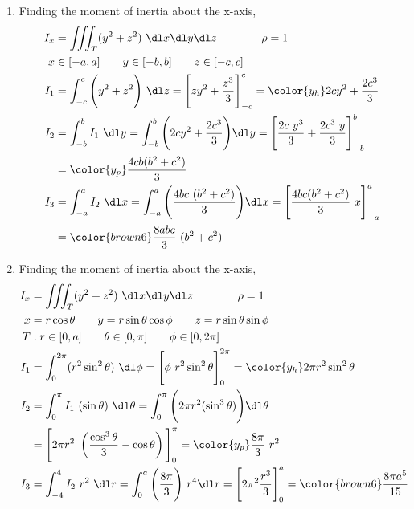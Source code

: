 \begin{enumerate}
     \item Finding the moment of inertia about the x-axis,
           \begin{align}
                I_x & = \iiint_T (y^2 + z^2)\ \dl x \dl y \dl z \qquad\qquad \rho = 1 \\
                x   & \in [-a, a] \qquad y \in [-b, b] \qquad z \in [-c, c]           \\
                I_1 & = \int_{-c}^{c} \Bigg(y^2 + z^2\Bigg)\ \dl z
                = \Bigg[ zy^2 + \frac{z^3}{3} \Bigg]_{-c}^{c}
                = {\color{y_h} 2cy^2 + \frac{2c^3}{3}}                                \\
                I_2 & = \int_{-b}^{b} I_1 \ \dl y
                = \int_{-b}^{b} \Bigg( 2cy^2 + \frac{2c^3}{3} \Bigg) \dl y
                = \Bigg[ \frac{2c\ y^3}{3} + \frac{2c^3\ y}{3} \Bigg]_{-b}^{b}        \\
                    & = {\color{y_p} \frac{4cb(b^2 + c^2)}{3} }                       \\
                I_3 & = \int_{-a}^{a} I_2\ \dl x = \int_{-a}^{a}
                \Bigg( \frac{4bc\ (b^2 + c^2)}{3} \Bigg) \dl x
                = \Bigg[ \frac{4bc (b^2 + c^2)}{3}\ x \Bigg]_{-a}^{a}                 \\
                    & = {\color{brown6} \frac{8abc}{3}\ (b^2 + c^2)}
           \end{align}

     \item Finding the moment of inertia about the x-axis,
           \begin{align}
                I_x & = \iiint_T (y^2 + z^2)\ \dl x \dl y \dl z \qquad\qquad \rho = 1 \\
                x   & = r \cos \theta \qquad y = r\sin \theta \cos \phi
                \qquad z = r \sin \theta \sin \phi                                    \\
                T   & : r \in [0, a] \qquad \theta \in [0, \pi]
                \qquad \phi \in [0, 2\pi]                                             \\
                I_1 & = \int_{0}^{2\pi} (r^2 \sin^2 \theta )\ \dl \phi
                = \Bigg[ \phi\ r^2 \sin^2 \theta \Bigg]_{0}^{2\pi}
                = {\color{y_h} 2\pi r^2 \sin^2 \theta}                                \\
                I_2 & = \int_{0}^{\pi} I_1 \ (\sin \theta)\ \dl \theta
                = \int_{0}^{\pi} \Bigg( 2\pi r^2 ( \sin^3 \theta)  \Bigg) \dl \theta  \\
                    & = \Bigg[  2\pi r^2\ \left( \frac{\cos^3 \theta}{3}
                     - \cos \theta \right) \Bigg]_{0}^{\pi}
                = {\color{y_p} \frac{8\pi}{3}\ r^2 }                                  \\
                I_3 & = \int_{-4}^{4} I_2 \ r^2\ \dl r = \int_{0}^{a}
                \Bigg( \frac{8\pi}{3} \Bigg)\ r^4 \dl r
                = \Bigg[ 2\pi^2 \frac{r^3}{3} \Bigg]_{0}^{a}
                = {\color{brown6} \frac{8\pi a^5}{15}}
           \end{align}


\end{enumerate}
